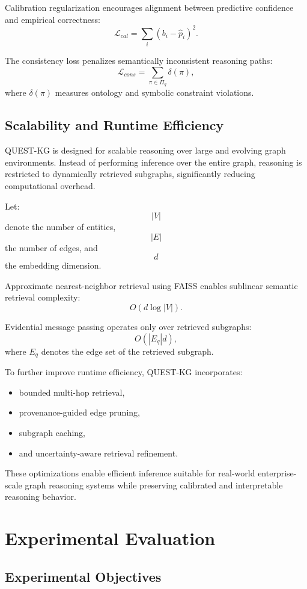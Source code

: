 \documentclass[sigconf,review,anonymous]{acmart}
\begin{document}
Calibration regularization encourages alignment between predictive confidence and empirical correctness:
\[
\mathcal{L}_{cal}
=
\sum_i
\left(
b_i-\hat{p}_i
\right)^2.
\]

The consistency loss penalizes semantically inconsistent reasoning paths:
\[
\mathcal{L}_{cons}
=
\sum_{\pi\in\Pi_q}
\delta(\pi),
\]
where $\delta(\pi)$ measures ontology and symbolic constraint violations.

\subsection{Scalability and Runtime Efficiency}

QUEST-KG is designed for scalable reasoning over large and evolving graph environments. Instead of performing inference over the entire graph, reasoning is restricted to dynamically retrieved subgraphs, significantly reducing computational overhead.

Let:
\[
|V|
\]
denote the number of entities,
\[
|E|
\]
the number of edges, and
\[
d
\]
the embedding dimension.

Approximate nearest-neighbor retrieval using FAISS enables sublinear semantic retrieval complexity:
\[
O(d\log |V|).
\]

Evidential message passing operates only over retrieved subgraphs:
\[
O(|E_q|d),
\]
where $E_q$ denotes the edge set of the retrieved subgraph.

To further improve runtime efficiency, QUEST-KG incorporates:
\begin{itemize}
    \item bounded multi-hop retrieval,
    \item provenance-guided edge pruning,
    \item subgraph caching,
    \item and uncertainty-aware retrieval refinement.
\end{itemize}

These optimizations enable efficient inference suitable for real-world enterprise-scale graph reasoning systems while preserving calibrated and interpretable reasoning behavior.

\section{Experimental Evaluation}

\subsection{Experimental Objectives}
\end{document}
